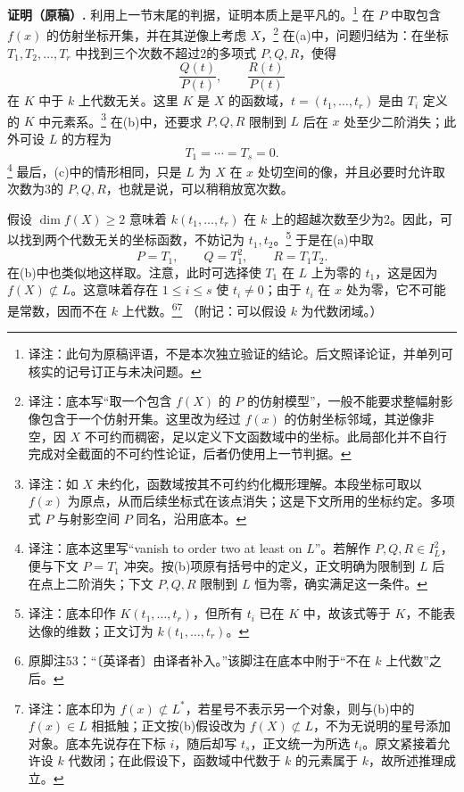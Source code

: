 \documentclass[openany]{ctexbook}
\newcommand{\note}[1]{\footnote{译注：#1}}
\begin{document}
\noindent\textbf{证明（原稿）.}
利用上一节末尾的判据，证明本质上是平凡的。\note{此句为原稿评语，不是本次独立验证的结论。后文照译论证，并单列可核实的记号订正与未决问题。}
在 $P$ 中取包含 $f(x)$ 的仿射坐标开集，并在其逆像上考虑 $X$，\note{底本写“取一个包含 $f(X)$ 的 $P$ 的仿射模型”，一般不能要求整幅射影像包含于一个仿射开集。这里改为经过 $f(x)$ 的仿射坐标邻域，其逆像非空，因 $X$ 不可约而稠密，足以定义下文函数域中的坐标。此局部化并不自行完成对全截面的不可约性论证，后者仍使用上一节判据。}
在(a)中，问题归结为：在坐标 $T_1,T_2,\ldots,T_r$ 中找到三个次数不超过2的多项式 $P,Q,R$，使得
\[
\frac{Q(t)}{P(t)},\qquad \frac{R(t)}{P(t)}
\]
在 $K$ 中于 $k$ 上代数无关。这里 $K$ 是 $X$ 的函数域，$t=(t_1,\ldots,t_r)$ 是由 $T_i$ 定义的 $K$ 中元素系。\note{如 $X$ 未约化，函数域按其不可约约化概形理解。本段坐标可取以 $f(x)$ 为原点，从而后续坐标式在该点消失；这是下文所用的坐标约定。多项式 $P$ 与射影空间 $P$ 同名，沿用底本。}
在(b)中，还要求 $P,Q,R$ 限制到 $L$ 后在 $x$ 处至少二阶消失；此外可设 $L$ 的方程为
\[
T_1=\cdots=T_s=0.
\]
\note{底本这里写“vanish to order two at least on $L$”。若解作 $P,Q,R\in I_L^2$，便与下文 $P=T_1$ 冲突。按(b)项原有括号中的定义，正文明确为限制到 $L$ 后在点上二阶消失；下文 $P,Q,R$ 限制到 $L$ 恒为零，确实满足这一条件。}
最后，(c)中的情形相同，只是 $L$ 为 $X$ 在 $x$ 处切空间的像，并且必要时允许取次数为3的 $P,Q,R$，也就是说，可以稍稍放宽次数。

假设 $\dim f(X)\ge2$ 意味着 $k(t_1,\ldots,t_r)$ 在 $k$ 上的超越次数至少为2。因此，可以找到两个代数无关的坐标函数，不妨记为 $t_1,t_2$。\note{底本印作 $K(t_1,\ldots,t_r)$，但所有 $t_i$ 已在 $K$ 中，故该式等于 $K$，不能表达像的维数；正文订为 $k(t_1,\ldots,t_r)$。}
于是在(a)中取
\[
P=T_1,\qquad Q=T_1^2,\qquad R=T_1T_2.
\]
在(b)中也类似地这样取。注意，此时可选择使 $T_1$ 在 $L$ 上为零的 $t_1$，这是因为 $f(X)\not\subset L$。这意味着存在 $1\le i\le s$ 使 $t_i\ne0$；由于 $t_i$ 在 $x$ 处为零，它不可能是常数，因而不在 $k$ 上代数。\footnote{原脚注53：“〔英译者〕由译者补入。”该脚注在底本中附于“不在 $k$ 上代数”之后。}\note{底本印为 $f(x)\not\subset L^*$，若星号不表示另一个对象，则与(b)中的 $f(x)\in L$ 相抵触；正文按(b)假设改为 $f(X)\not\subset L$，不为无说明的星号添加对象。底本先说存在下标 $i$，随后却写 $t_s$，正文统一为所选 $t_i$。原文紧接着允许设 $k$ 代数闭；在此假设下，函数域中代数于 $k$ 的元素属于 $k$，故所述推理成立。}
（附记：可以假设 $k$ 为代数闭域。）
\end{document}
